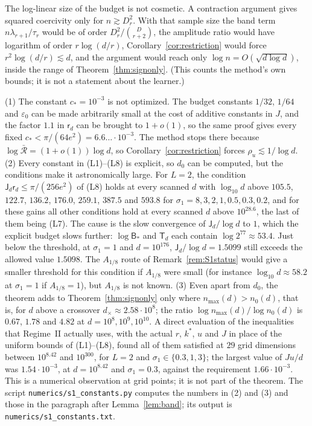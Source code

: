 \begin{remark}
The log-linear size of the budget is not cosmetic. A contraction argument
gives squared coercivity only for $n\gtrsim D_r^2$. With that sample size the band term
$n\lambda_{r+1}/\tau_r$ would be of order $D_r^2/\binom D{r+2}$, the
amplitude ratio would have logarithm of order $r\log(d/r)$,
Corollary~\ref{cor:restriction} would force $r^2\log(d/r)\lesssim d$, and the
argument would reach only $\log n=O(\sqrt{d\log d})$, inside the range of
Theorem~\ref{thm:signonly}. (This counts the method's own bounds; it is not
a statement about the learner.)
\end{remark}

\begin{remark}\label{rem:d0}
(1) The constant $c_*=10^{-3}$ is not optimized. The budget constants
$1/32$, $1/64$ and $\varepsilon_0$ can be made arbitrarily small at the
cost of additive constants in $J$, and the factor $1.1$ in $\mathsf r_d$
can be brought to $1+o(1)$, so the same proof gives every fixed
$c_*<\pi/(64e^2)=6.6\ldots\cdot10^{-3}$. The method stops there because
$\log\bar{\mathcal R}=(1+o(1))\log d$, so Corollary~\ref{cor:restriction}
forces $\rho_u\lesssim1/\log d$.
(2) Every constant in (L1)--(L8) is explicit, so $d_0$ can be computed,
but the conditions make it astronomically large. For $L=2$, the condition
$\mathsf J_d\mathsf r_d\le\pi/(256e^2)$ of (L8) holds at every scanned $d$
with $\log_{10}d$ above $105.5$, $122.7$, $136.2$, $176.0$, $259.1$,
$387.5$ and $593.8$ for $\sigma_1=8,3,2,1,0.5,0.3,0.2$, and for these gains
all other conditions hold at every scanned $d$ above $10^{28.6}$, the last
of them being (L7). The cause is the slow convergence of
$\mathsf J_d/\log d$ to $1$, which the explicit budget slows further:
$\log\mathsf B_*$ and $\mathsf T_d$ each contain $\log2^{77}\approx53.4$.
Just below the threshold, at $\sigma_1=1$ and $d=10^{176}$,
$\mathsf J_d/\log d=1.5099$ still exceeds the allowed value $1.5098$. The
$A_{1/8}$ route of Remark~\ref{rem:S1status} would give a smaller
threshold for this condition if $A_{1/8}$ were small (for instance
$\log_{10}d\approx58.2$ at $\sigma_1=1$ if $A_{1/8}=1$), but $A_{1/8}$ is
not known.
(3) Even apart from $d_0$, the theorem adds to Theorem~\ref{thm:signonly}
only where $n_{\max}(d)>n_0(d)$, that is, for $d$ above a crossover
$d_\times\approx2.58\cdot10^8$; the ratio $\log n_{\max}(d)/\log n_0(d)$ is
$0.67$, $1.78$ and $4.82$ at $d=10^8,10^9,10^{10}$. A direct evaluation of
the inequalities that Regime~II actually uses, with the actual $r$, $k^*$,
$u$ and $J$ in place of the uniform bounds of (L1)--(L8), found all of them
satisfied at $29$ grid dimensions between $10^{8.42}$ and $10^{300}$, for
$L=2$ and $\sigma_1\in\{0.3,1,3\}$; the largest value of $Ju/d$ was
$1.54\cdot10^{-3}$, at $d=10^{8.42}$ and $\sigma_1=0.3$, against the
requirement $1.66\cdot10^{-3}$. This is a numerical observation at grid
points; it is not part of the theorem. The script
\texttt{numerics/\allowbreak s1\_constants.py} computes the numbers in (2)
and (3) and those in the paragraph after Lemma~\ref{lem:band}; its output
is \texttt{numerics/\allowbreak s1\_constants.txt}.
\end{remark}

